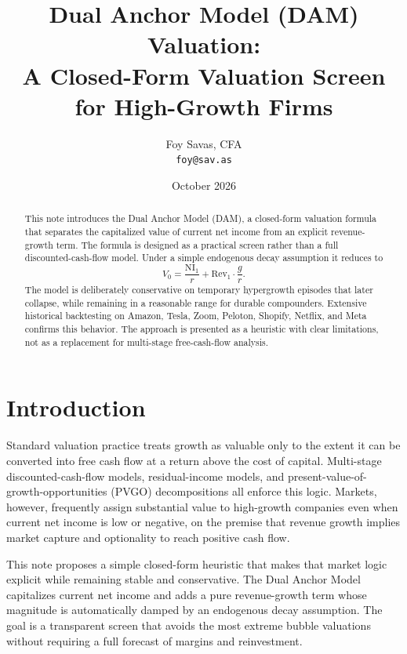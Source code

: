 \documentclass[11pt]{article}
\title{Dual Anchor Model (DAM) Valuation:\\
A Closed-Form Valuation Screen for High-Growth Firms}
\author{Foy Savas, CFA\\ \texttt{foy@sav.as}}
\date{October 2026}
\begin{document}
\maketitle

\begin{abstract}
This note introduces the Dual Anchor Model (DAM), a closed-form valuation formula that separates the capitalized value of current net income from an explicit revenue-growth term. The formula is designed as a practical screen rather than a full discounted-cash-flow model. Under a simple endogenous decay assumption it reduces to
\begin{equation}
V_0 = \frac{\mathrm{NI}_1}{r} + \mathrm{Rev}_1 \cdot \frac{g}{r}.
\end{equation}
The model is deliberately conservative on temporary hypergrowth episodes that later collapse, while remaining in a reasonable range for durable compounders. Extensive historical backtesting on Amazon, Tesla, Zoom, Peloton, Shopify, Netflix, and Meta confirms this behavior. The approach is presented as a heuristic with clear limitations, not as a replacement for multi-stage free-cash-flow analysis.
\end{abstract}

\section{Introduction}
Standard valuation practice treats growth as valuable only to the extent it can be converted into free cash flow at a return above the cost of capital. Multi-stage discounted-cash-flow models, residual-income models, and present-value-of-growth-opportunities (PVGO) decompositions all enforce this logic. Markets, however, frequently assign substantial value to high-growth companies even when current net income is low or negative, on the premise that revenue growth implies market capture and optionality to reach positive cash flow.

This note proposes a simple closed-form heuristic that makes that market logic explicit while remaining stable and conservative. The Dual Anchor Model capitalizes current net income and adds a pure revenue-growth term whose magnitude is automatically damped by an endogenous decay assumption. The goal is a transparent screen that avoids the most extreme bubble valuations without requiring a full forecast of margins and reinvestment.
\end{document}
